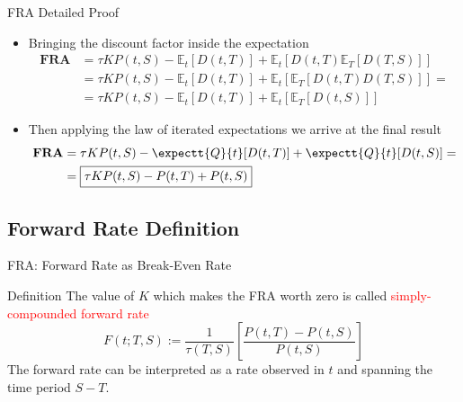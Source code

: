 \documentclass{beamer}
\begin{document}
\begin{frame}{FRA Detailed Proof}
	\begin{itemize}
	\item<1-> Bringing the discount factor inside the expectation
	\begin{equation*}
		\begin{aligned}
		\textbf{FRA} &= \tau KP(t,S)-\mathbb{E}_t[D(t,T)] + \mathbb{E}_t\left[D(t,T)\mathbb{E}_T[D(T,S)]\right] \\
		&=\tau KP(t,S)-\mathbb{E}_t[D(t,T)] + \mathbb{E}_t\left[\mathbb{E}_T[D(t,T)D(T,S)]\right]=\\
		&=\tau KP(t,S)-\mathbb{E}_t[D(t,T)] + \mathbb{E}_t\left[\mathbb{E}_T[D(t,S)]\right]
	\end{aligned}
\end{equation*}		
		\item<2-> Then applying the law of iterated expectations we arrive at the final result
		\begin{equation*}
			\begin{aligned}
			\textbf{FRA} &= \tau KP(t,S)-\expectt{Q}{t}[D(t,T)] + \expectt{Q}{t}[D(t,S)] = \\
				&= \boxed{\tau KP(t,S) - P(t,T) + P(t,S)}
			\end{aligned}
		\end{equation*}
		\myendproof
	\end{itemize}
\pause
{}
\end{frame}

\subsection{Forward Rate Definition}
\begin{frame}{FRA: Forward Rate as Break-Even Rate}
	\begin{block}{Definition}
		The value of $K$ which makes the FRA worth zero is called \textcolor{red}{simply-compounded forward rate}
		\begin{equation}
			F(t;T,S):=\frac{1}{\tau(T,S)}\left[\frac{P(t,T)-P(t,S)}{P(t,S)}\right]
			\label{eq:forward_rate_definition}
		\end{equation}
		The forward rate can be interpreted as a rate observed in $t$ and spanning the time period $S-T$.
	\end{block}
	
\end{frame}
\end{document}
